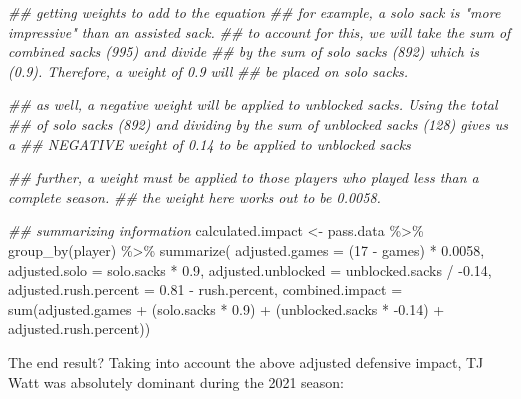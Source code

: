 \documentclass[
  letterpaper,
]{krantz}
\newenvironment{Shaded}{\begin{snugshade}}{\end{snugshade}}
\newcommand{\AttributeTok}[1]{\textcolor[rgb]{0.40,0.45,0.13}{#1}}
\newcommand{\DecValTok}[1]{\textcolor[rgb]{0.68,0.00,0.00}{#1}}
\newcommand{\DocumentationTok}[1]{\textcolor[rgb]{0.37,0.37,0.37}{\textit{#1}}}
\newcommand{\FloatTok}[1]{\textcolor[rgb]{0.68,0.00,0.00}{#1}}
\newcommand{\FunctionTok}[1]{\textcolor[rgb]{0.28,0.35,0.67}{#1}}
\newcommand{\NormalTok}[1]{\textcolor[rgb]{0.00,0.23,0.31}{#1}}
\newcommand{\OtherTok}[1]{\textcolor[rgb]{0.00,0.23,0.31}{#1}}
\newcommand{\SpecialCharTok}[1]{\textcolor[rgb]{0.37,0.37,0.37}{#1}}
\begin{document}
\begin{Shaded}
\begin{Highlighting}[]
\DocumentationTok{\#\# getting weights to add to the equation}
\DocumentationTok{\#\# for example, a solo sack is "more impressive" than an assisted sack. }
\DocumentationTok{\#\# to account for this, we will take the sum of combined sacks (995) and divide }
\DocumentationTok{\#\# by the sum of solo sacks (892) which is (0.9). Therefore, a weight of 0.9 will}
\DocumentationTok{\#\# be placed on solo sacks.}

\DocumentationTok{\#\# as well, a negative weight will be applied to unblocked sacks. Using the total}
\DocumentationTok{\#\# of solo sacks (892) and dividing by the sum of unblocked sacks (128) gives us a}
\DocumentationTok{\#\# NEGATIVE weight of 0.14 to be applied to unblocked sacks}

\DocumentationTok{\#\# further, a weight must be applied to those players who played less than a complete season.}
\DocumentationTok{\#\# the weight here works out to be 0.0058.}

\DocumentationTok{\#\# summarizing information}
\NormalTok{calculated.impact }\OtherTok{\textless{}{-}}\NormalTok{ pass.data }\SpecialCharTok{\%\textgreater{}\%}
  \FunctionTok{group\_by}\NormalTok{(player) }\SpecialCharTok{\%\textgreater{}\%}
  \FunctionTok{summarize}\NormalTok{(}
    \AttributeTok{adjusted.games =}\NormalTok{ (}\DecValTok{17} \SpecialCharTok{{-}}\NormalTok{ games) }\SpecialCharTok{*} \FloatTok{0.0058}\NormalTok{,}
    \AttributeTok{adjusted.solo =}\NormalTok{ solo.sacks }\SpecialCharTok{*} \FloatTok{0.9}\NormalTok{,}
    \AttributeTok{adjusted.unblocked =}\NormalTok{ unblocked.sacks }\SpecialCharTok{/} \SpecialCharTok{{-}}\FloatTok{0.14}\NormalTok{,}
    \AttributeTok{adjusted.rush.percent =} \FloatTok{0.81} \SpecialCharTok{{-}}\NormalTok{ rush.percent,}
    \AttributeTok{combined.impact =} \FunctionTok{sum}\NormalTok{(adjusted.games }\SpecialCharTok{+}\NormalTok{ (solo.sacks }\SpecialCharTok{*} \FloatTok{0.9}\NormalTok{) }\SpecialCharTok{+}\NormalTok{ (unblocked.sacks }\SpecialCharTok{*} \SpecialCharTok{{-}}\FloatTok{0.14}\NormalTok{) }\SpecialCharTok{+}\NormalTok{ adjusted.rush.percent))}
\end{Highlighting}
\end{Shaded}

The end result? Taking into account the above adjusted defensive impact,
TJ Watt was absolutely dominant during the 2021 season:
\end{document}
